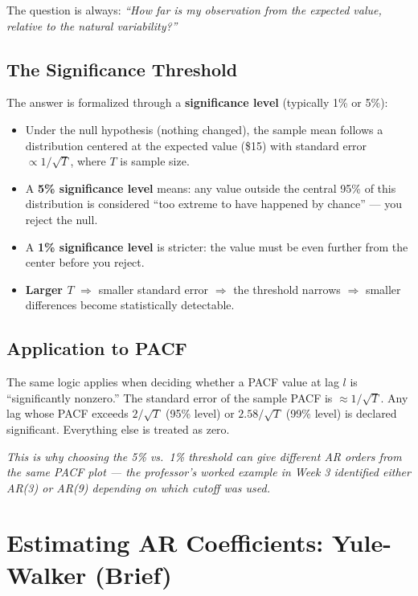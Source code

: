 \documentclass[11pt]{article}
\begin{document}
The question is always: \textit{``How far is my observation from the expected
value, relative to the natural variability?''}

\subsection{The Significance Threshold}
The answer is formalized through a \textbf{significance level}
(typically 1\% or 5\%):

\begin{itemize}
    \item Under the null hypothesis (nothing changed), the sample mean
      follows a distribution centered at the expected value (\$15) with
      standard error $\propto 1/\sqrt{T}$, where $T$ is sample size.
    \item A \textbf{5\% significance level} means: any value outside the
      central 95\% of this distribution is considered ``too extreme to
      have happened by chance'' --- you reject the null.
    \item A \textbf{1\% significance level} is stricter: the value must be
      even further from the center before you reject.
    \item \textbf{Larger $T$} $\Rightarrow$ smaller standard error $\Rightarrow$
      the threshold narrows $\Rightarrow$ smaller differences become
      statistically detectable.
\end{itemize}

\subsection{Application to PACF}
The same logic applies when deciding whether a PACF value at lag $l$ is
``significantly nonzero.'' The standard error of the sample PACF is
$\approx 1/\sqrt{T}$. Any lag whose PACF exceeds $2/\sqrt{T}$ (95\% level)
or $2.58/\sqrt{T}$ (99\% level) is declared significant. Everything else
is treated as zero.

\textit{This is why choosing the 5\% vs.\ 1\% threshold can give different
AR orders from the same PACF plot --- the professor's worked example in
Week 3 identified either AR(3) or AR(9) depending on which cutoff was used.}


\section{Estimating AR Coefficients: Yule-Walker (Brief)}
\end{document}
